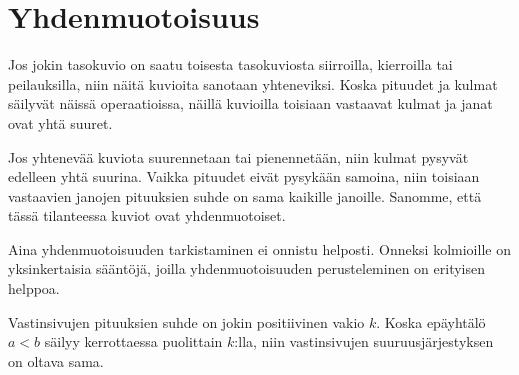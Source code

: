 \section*{Yhdenmuotoisuus}

Jos jokin tasokuvio on saatu toisesta tasokuviosta siirroilla, kierroilla tai
peilauksilla, niin näitä kuvioita sanotaan yhteneviksi. Koska pituudet ja kulmat säilyvät
näissä operaatioissa, näillä kuvioilla toisiaan vastaavat kulmat ja janat
ovat yhtä suuret.

Jos yhtenevää kuviota suurennetaan tai pienennetään, niin kulmat pysyvät edelleen yhtä suurina.
Vaikka pituudet eivät pysykään samoina, niin toisiaan vastaavien janojen pituuksien suhde
on sama kaikille janoille. Sanomme, että tässä tilanteessa kuviot ovat yhdenmuotoiset.


Aina yhdenmuotoisuuden tarkistaminen ei onnistu helposti. Onneksi kolmioille on yksinkertaisia
sääntöjä, joilla yhdenmuotoisuuden perusteleminen on erityisen helppoa.


Vastinsivujen pituuksien suhde on jokin positiivinen vakio $k$. Koska
epäyhtälö $a < b$ säilyy kerrottaessa puolittain $k$:lla, niin vastinsivujen
suuruusjärjestyksen on oltava sama.

